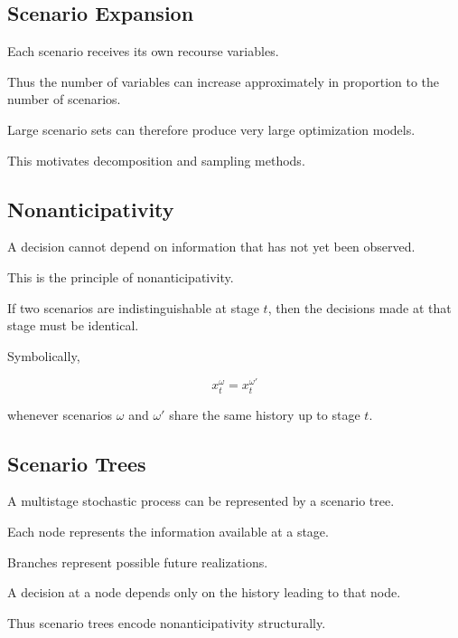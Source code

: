 \subsection{Scenario Expansion}
\label{subsec:scenario-expansion}

Each scenario receives its own recourse variables.

Thus the number of variables can increase approximately in proportion to
the number of scenarios.

Large scenario sets can therefore produce very large optimization models.

This motivates decomposition and sampling methods.

\subsection{Nonanticipativity}
\label{subsec:nonanticipativity}

A decision cannot depend on information that has not yet been observed.

This is the principle of nonanticipativity.

If two scenarios are indistinguishable at stage \(t\), then the decisions
made at that stage must be identical.

Symbolically,

\[
\boxed{
x_t^\omega
=
x_t^{\omega'}
}
\]

whenever scenarios \(\omega\) and \(\omega'\) share the same history up to
stage \(t\).

\subsection{Scenario Trees}
\label{subsec:scenario-trees}

A multistage stochastic process can be represented by a scenario tree.

Each node represents the information available at a stage.

Branches represent possible future realizations.

A decision at a node depends only on the history leading to that node.

Thus scenario trees encode nonanticipativity structurally.

